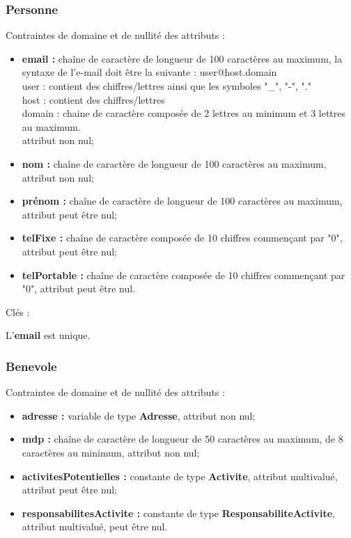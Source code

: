 \subsubsection*{Personne}
Contraintes de domaine et de nullité des attributs :
\begin{itemize}
	\item \textbf{email :} chaîne de caractère de longueur de 100 caractères au maximum, la syntaxe de l'e-mail doit être la suivante : user@host.domain\\
	user : contient des chiffres/lettres ainsi que les symboles "\_", "-", "." \\
	host : contient des chiffres/lettres \\
	domain : chaine de caractère composée de 2 lettres au minimum et 3 lettres au maximum. \\
	attribut non nul;  
 	\item \textbf{nom :} chaîne de caractère de longueur de 100 caractères au maximum, attribut non nul;
	\item \textbf{prénom :} chaîne de caractère de longueur de 100 caractères au maximum, attribut peut être nul;
	\item \textbf{telFixe :} chaîne de caractère composée de 10 chiffres commençant par "0", attribut peut être nul;
	\item \textbf{telPortable :} chaîne de caractère composée de 10 chiffres commençant par "0", attribut peut être nul.\\
\end{itemize}  

Clés : 

L'\textbf{email} est unique.\\

\subsubsection*{Benevole}
Contraintes de domaine et de nullité des attributs :
\begin{itemize}
 	\item \textbf{adresse :} variable de type \textbf{Adresse}, attribut non nul;
	\item \textbf{mdp :} chaîne de caractère de longueur de 50 caractères au maximum, de 8 caractères au minimum, attribut non nul;  
	\item \textbf{activitesPotentielles :} constante de type \textbf{Activite}, attribut multivalué, attribut  peut être nul;
	\item \textbf{responsabilitesActivite :} constante de type \textbf{ResponsabiliteActivite}, attribut multivalué, peut être nul.\\
\end{itemize}  
 
